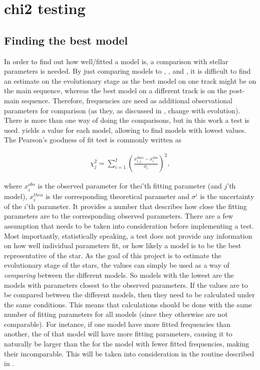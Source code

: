 \section{chi2 testing}
\label{sec:chis}

\subsection{Finding the best model}
\label{bestmodel}


In order to find out how well/fitted a model is, a comparison with stellar parameters is needed. By just comparing models to \lum,  \teff, and \logg, it is difficult to find an estimate on the evolutionary stage as the best model on one track might be on the main sequence, whereas the best model on a different track is on the post-main sequence. Therefore, frequencies are need as additional observational parameters for comparison (as they, as discussed in , change with evolution). There is more than one way of doing the comparisons, but in this work a \chis test is used. \chis yields a value for each model, allowing to find models with lowest \chis values. The Pearson's goodness of fit test is commonly written as 

\begin{align}
\label{standard_chi}
\chi^2_j = \sum^I_{i=1}\left(\frac{x^{\text{theo}}_{i,j}-x^{\text{obs}}_i}{\sigma_i}\right)^2,
\end{align}

\noindent where $x_i^{obs}$ is the observed parameter for the$ i$'th fitting parameter (and $j$'th model), $x^{theo}_i$ is the corresponding theoretical parameter and $\sigma^i$ is the uncertainty of the $i$'th parameter. It provides a number that describes how close the fitting parameters are to the corresponding observed parameters. There are a few assumption that needs to be taken into consideration before implementing a \chis test. Most importantly, statistically speaking, a \chis test does not provide any information on how well individual parameters fit, or how likely a model is to be the best representative of the star. As the goal of this project is to estimate the evolutionary stage of the stars, the \chis values can simply be used as a way of \textit{comparing} between the different models. So models with the lowest \chis are the models with parameters closest to the observed parameters. 
If the \chis values are to be compared between the different models, then they need to be calculated under the same conditions. This means that calculations should be done with the same number of fitting parameters for all models (since they otherwise are not comparable). For instance, if one model have more fitted frequencies than another, the \chis of that model will have more fitting parameters, causing it to naturally be larger than the \chis for the model with fewer fitted frequencies, making their \chis incomparable. This will be taken into consideration in the routine described in .

